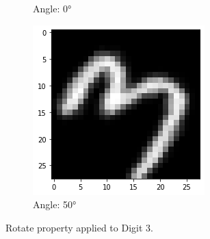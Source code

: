 \begin{figure}[!htbp]
\begin{subfigure}[b]{.3\textwidth}
            \caption{Angle: \ang{0}}
            \label{fig:Rotate-misclass0}
        \end{subfigure}%
        \begin{subfigure}[b]{.3\textwidth}
            \centering
            \includegraphics[width=\linewidth]{images/rotate3.png}
            \caption{Angle: \ang{50}}
            \label{fig:Rotate-misclass0}
        \end{subfigure}
        \caption{Rotate property applied to Digit 3.}
        \label{fig:Rotate-property}
    \end{figure}
    \FloatBarrier
    

